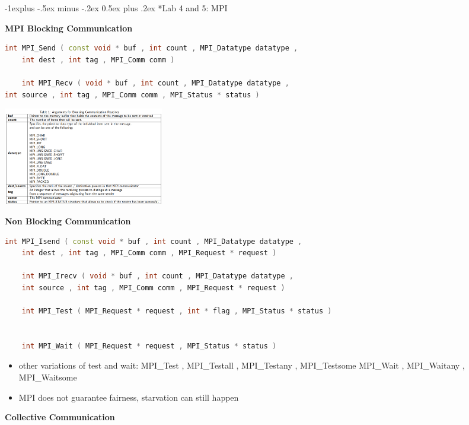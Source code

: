 \documentclass[10pt, landscape]{article}
\makeatletter
\renewcommand{\subsection}{\@startsection{subsection}{2}{0mm}%
                                {-1explus -.5ex minus -.2ex}%
                                {0.5ex plus .2ex}%
                                {\normalfont\normalsize\bfseries}}
\makeatother
\begin{document}
\begin{multicols}{4}
\subsection*{Lab 4 and 5: MPI}

\textbf{MPI Blocking Communication}
\begin{lstlisting}[language=C++, breaklines=true, breakatwhitespace=true]
    int MPI_Send ( const void * buf , int count , MPI_Datatype datatype ,
    int dest , int tag , MPI_Comm comm )

    int MPI_Recv ( void * buf , int count , MPI_Datatype datatype ,
int source , int tag , MPI_Comm comm , MPI_Status * status )
    \end{lstlisting}

\includegraphics*[width=7cm]{MPI_BLOCKING.png}


\textbf{Non Blocking Communication}
\begin{lstlisting}[language=C++, breaklines=true, breakatwhitespace=true]
    int MPI_Isend ( const void * buf , int count , MPI_Datatype datatype ,
    int dest , int tag , MPI_Comm comm , MPI_Request * request )

    int MPI_Irecv ( void * buf , int count , MPI_Datatype datatype ,
    int source , int tag , MPI_Comm comm , MPI_Request * request )

    int MPI_Test ( MPI_Request * request , int * flag , MPI_Status * status )


    int MPI_Wait ( MPI_Request * request , MPI_Status * status )

    \end{lstlisting}
    \begin{itemize}
        \item other variations of test and wait: MPI\_Test , MPI\_Testall , MPI\_Testany , MPI\_Testsome
        MPI\_Wait , MPI\_Waitany , MPI\_Waitsome
        \item MPI does not guarantee fairness, starvation can still happen
    \end{itemize}


\textbf{Collective Communication}


\end{multicols}
\end{document}
